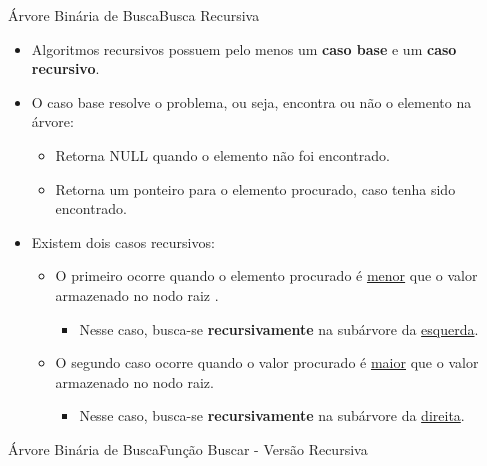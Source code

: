\documentclass[aspectratio=169]{beamer}
\begin{document}
\begin{frame}{Árvore Binária de Busca}{Busca Recursiva}
\begin{itemize}
 \item Algoritmos recursivos possuem pelo menos um {\bf caso base} e um {\bf caso recursivo}.
 \item O caso base resolve o problema, ou seja, encontra ou não o elemento na árvore:
 \begin{itemize}
 \item Retorna NULL quando o elemento não foi encontrado.
 \item Retorna um ponteiro para o elemento procurado, caso tenha sido encontrado.
 \end{itemize}
 \item Existem dois casos recursivos:
 \begin{itemize}
 \item O primeiro ocorre quando o elemento procurado é \underline{menor} que o valor armazenado no nodo raiz .
 \begin{itemize}
 \item Nesse caso, busca-se {\bf recursivamente} na subárvore da \underline{esquerda}.
 \end{itemize}
 \item O segundo caso ocorre quando o valor procurado é \underline{maior} que o valor armazenado no nodo raiz.
 \begin{itemize}
 \item Nesse caso, busca-se {\bf recursivamente} na subárvore da \underline{direita}.
 \end{itemize} 
 \end{itemize}
\end{itemize}
\end{frame}


\begin{frame}{Árvore Binária de Busca}{Função Buscar - Versão Recursiva}
\begin{algorithm}[H]
\caption{Busca} 
\label{BuscarRecursivo}
\end{algorithm}
\end{frame}
\end{document}
